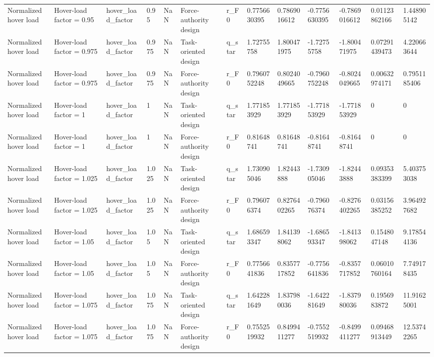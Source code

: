 \begin{tabular}{@{}lllllllllllll@{}}
Normalized hover load & Hover-load factor = 0.95 & hover\_load\_factor & 0.95 & NaN & Force-authority design & r\_F0 & 0.7756630395 & 0.7869016612 & -0.7756630395 & -0.7869016612 & 0.01123862166 & 1.448905142 \\
Normalized hover load & Hover-load factor = 0.975 & hover\_load\_factor & 0.975 & NaN & Task-oriented design & q\_star & 1.72755758 & 1.800471975 & -1.72755758 & -1.800471975 & 0.07291439473 & 4.220663644 \\
Normalized hover load & Hover-load factor = 0.975 & hover\_load\_factor & 0.975 & NaN & Force-authority design & r\_F0 & 0.7960752248 & 0.8024049665 & -0.7960752248 & -0.8024049665 & 0.00632974171 & 0.7951185406 \\
Normalized hover load & Hover-load factor = 1 & hover\_load\_factor & 1 & NaN & Task-oriented design & q\_star & 1.771853929 & 1.771853929 & -1.771853929 & -1.771853929 & 0 & 0 \\
Normalized hover load & Hover-load factor = 1 & hover\_load\_factor & 1 & NaN & Force-authority design & r\_F0 & 0.81648741 & 0.81648741 & -0.81648741 & -0.81648741 & 0 & 0 \\
Normalized hover load & Hover-load factor = 1.025 & hover\_load\_factor & 1.025 & NaN & Task-oriented design & q\_star & 1.730905046 & 1.82443888 & -1.730905046 & -1.82443888 & 0.09353383399 & 5.403753038 \\
Normalized hover load & Hover-load factor = 1.025 & hover\_load\_factor & 1.025 & NaN & Force-authority design & r\_F0 & 0.796076374 & 0.8276402265 & -0.796076374 & -0.8276402265 & 0.03156385252 & 3.964927682 \\
Normalized hover load & Hover-load factor = 1.05 & hover\_load\_factor & 1.05 & NaN & Task-oriented design & q\_star & 1.686593347 & 1.841398062 & -1.686593347 & -1.841398062 & 0.1548047148 & 9.178544136 \\
Normalized hover load & Hover-load factor = 1.05 & hover\_load\_factor & 1.05 & NaN & Force-authority design & r\_F0 & 0.7756641836 & 0.8357717852 & -0.7756641836 & -0.8357717852 & 0.06010760164 & 7.749178435 \\
Normalized hover load & Hover-load factor = 1.075 & hover\_load\_factor & 1.075 & NaN & Task-oriented design & q\_star & 1.642281649 & 1.837980036 & -1.642281649 & -1.837980036 & 0.1956983872 & 11.91625001 \\
Normalized hover load & Hover-load factor = 1.075 & hover\_load\_factor & 1.075 & NaN & Force-authority design & r\_F0 & 0.7552519932 & 0.8499411277 & -0.7552519932 & -0.8499411277 & 0.09468913449 & 12.53742265 \\

\end{tabular}
